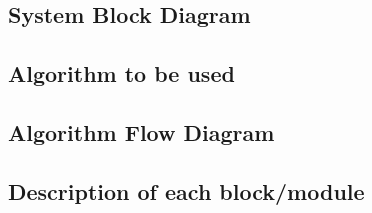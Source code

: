 \documentclass{article}
\begin{document}
\subsection{System Block Diagram}
\cleardoublepage

\subsection{Algorithm to be used}

\cleardoublepage

\subsection{Algorithm Flow Diagram}
\cleardoublepage

\subsection{Description of each block/module}
\end{document}
